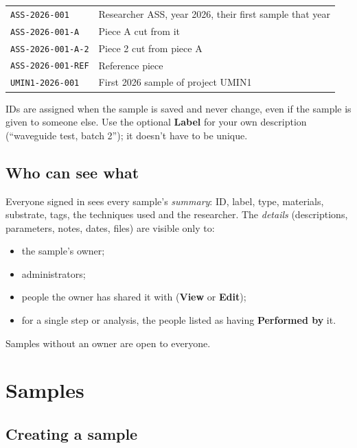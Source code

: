 \documentclass[11pt,a4paper]{article}
\newcommand{\ui}[1]{\textsf{\textbf{#1}}}
\newcommand{\sid}[1]{\texttt{#1}}
\begin{document}
\begin{center}
\begin{tabular}{@{}ll@{}}
\toprule
\sid{ASS-2026-001}       & Researcher ASS, year 2026, their first sample that year \\
\sid{ASS-2026-001-A}     & Piece A cut from it \\
\sid{ASS-2026-001-A-2}   & Piece 2 cut from piece A \\
\sid{ASS-2026-001-REF}   & Reference piece \\
\sid{UMIN1-2026-001}     & First 2026 sample of project UMIN1 \\
\bottomrule
\end{tabular}
\end{center}

IDs are assigned when the sample is saved and never change, even if the
sample is given to someone else. Use the optional \ui{Label} for your own
description (``waveguide test, batch 2''); it doesn't have to be unique.

\subsection{Who can see what}

Everyone signed in sees every sample's \emph{summary}: ID, label, type,
materials, substrate, tags, the techniques used and the researcher. The
\emph{details} (descriptions, parameters, notes, dates, files) are visible
only to:
\begin{itemize}
  \item the sample's owner;
  \item administrators;
  \item people the owner has shared it with (\ui{View} or \ui{Edit});
  \item for a single step or analysis, the people listed as having
        \ui{Performed by} it.
\end{itemize}

Samples without an owner are open to everyone.

\section{Samples}

\subsection{Creating a sample}
\end{document}

